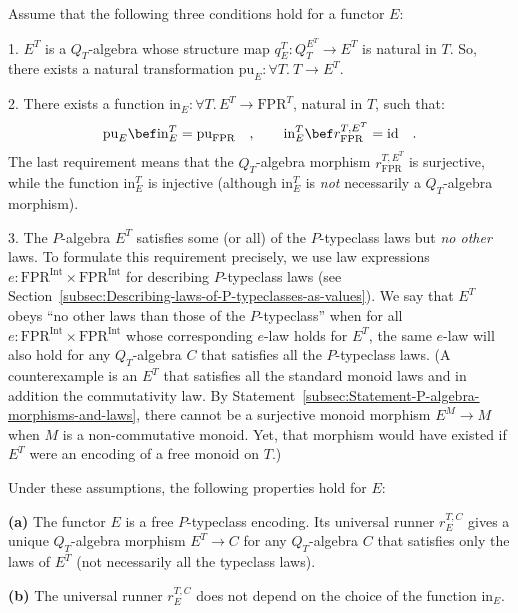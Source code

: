 Assume that the following three conditions hold for a functor $E$:

1. $E^{T}$ is a $Q_{T}$-algebra whose structure map $q_{E}^{T}:Q_{T}^{E^{T}}\rightarrow E^{T}$
is natural in $T$. So, there exists a natural transformation $\text{pu}_{E}:\forall T.\ T\rightarrow E^{T}$.

2. There exists a function $\text{in}_{E}:\forall T.\,E^{T}\rightarrow\text{FPR}^{T}$,
natural in $T$, such that:
\begin{equation}
\text{pu}_{E}\bef\text{in}_{E}^{T}=\text{pu}_{\text{FPR}}\quad,\quad\quad\text{in}_{E}^{T}\bef r_{\text{FPR}}^{T,E^{T}}=\text{id}\quad.\label{eq:properties-of-injection-for-free-P-typeclass-encoding}
\end{equation}
The last requirement means that the $Q_{T}$-algebra morphism $r_{\text{FPR}}^{T,E^{T}}$
is surjective, while the function $\text{in}_{E}^{T}$ is injective
(although $\text{in}_{E}^{T}$ is \emph{not} necessarily a $Q_{T}$-algebra
morphism).

3. The $P$-algebra $E^{T}$ satisfies some (or all) of the $P$-typeclass
laws but \emph{no other} laws. To formulate this requirement precisely,
we use law expressions $e:\text{FPR}^{\text{Int}}\times\text{FPR}^{\text{Int}}$
for describing $P$-typeclass laws (see Section~\ref{subsec:Describing-laws-of-P-typeclasses-as-values}).
We say that $E^{T}$ obeys \textsf{``}no other laws than those of the $P$-typeclass\textsf{''}
when for all $e:\text{FPR}^{\text{Int}}\times\text{FPR}^{\text{Int}}$
whose corresponding $e$-law holds for $E^{T}$, the same $e$-law
will also hold for any $Q_{T}$-algebra $C$ that satisfies all the
$P$-typeclass laws. (A counterexample is an $E^{T}$ that satisfies
all the standard monoid laws and in addition the commutativity law.
By Statement~\ref{subsec:Statement-P-algebra-morphisms-and-laws},
there cannot be a surjective monoid morphism $E^{M}\rightarrow M$
when $M$ is a non-commutative monoid. Yet, that morphism would have
existed if $E^{T}$ were an encoding of a free monoid on $T$.)

Under these assumptions, the following properties hold for $E$:

\textbf{(a)} The functor $E$ is a free $P$-typeclass encoding. Its
universal runner $r_{E}^{T,C}$ gives a unique $Q_{T}$-algebra morphism
$E^{T}\rightarrow C$ for any $Q_{T}$-algebra $C$ that satisfies
only the laws of $E^{T}$ (not necessarily all the typeclass laws). 

\textbf{(b)} The universal runner $r_{E}^{T,C}$ does not depend on
the choice of the function $\text{in}_{E}$.

